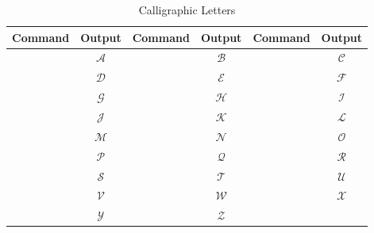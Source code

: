 \begin{table}[htbp]
	\centering
	\caption{Calligraphic  Letters}
	\label{tab:cal_letters}
	\begin{tabularx}{\linewidth}{CcCcCc}
		\toprule
			\textbf{Command}      & \textbf{Output} & \textbf{Command}      & \textbf{Output} & \textbf{Command}      & \textbf{Output} \\
		\midrule
			 & \(\mathcal{A}\) &  & \(\mathcal{B}\) &  & \(\mathcal{C}\) \\
			 & \(\mathcal{D}\) &  & \(\mathcal{E}\) &  & \(\mathcal{F}\) \\
			 & \(\mathcal{G}\) &  & \(\mathcal{H}\) &  & \(\mathcal{I}\) \\
			 & \(\mathcal{J}\) &  & \(\mathcal{K}\) &  & \(\mathcal{L}\) \\
			 & \(\mathcal{M}\) &  & \(\mathcal{N}\) &  & \(\mathcal{O}\) \\
			 & \(\mathcal{P}\) &  & \(\mathcal{Q}\) &  & \(\mathcal{R}\) \\
			 & \(\mathcal{S}\) &  & \(\mathcal{T}\) &  & \(\mathcal{U}\) \\
			 & \(\mathcal{V}\) &  & \(\mathcal{W}\) &  & \(\mathcal{X}\) \\
			 & \(\mathcal{Y}\) &  & \(\mathcal{Z}\) &                       &                 \\
		\bottomrule
	\end{tabularx}
\end{table}

